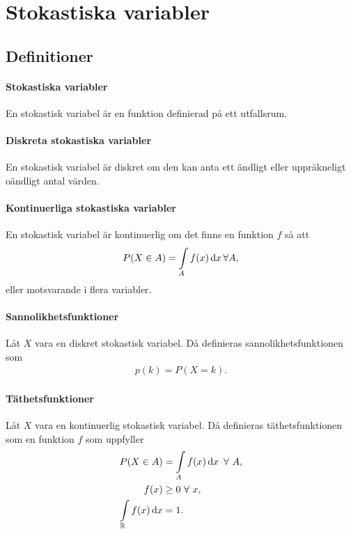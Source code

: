\section{Stokastiska variabler}

\subsection{Definitioner}

\paragraph{Stokastiska variabler}
En stokastisk variabel är en funktion definierad på ett utfallsrum.

\paragraph{Diskreta stokastiska variabler}
En stokastisk variabel är diskret om den kan anta ett ändligt eller uppräkneligt oändligt antal värden.

\paragraph{Kontinuerliga stokastiska variabler}
En stokastisk variabel är kontinuerlig om det finns en funktion $f$ så att
\begin{align*}
	P(X\in A) = \int\limits_{A}{}f(x)\dd{x}\forall A,
\end{align*}
eller motsvarande i flera variabler.

\paragraph{Sannolikhetsfunktioner}
Låt $X$ vara en diskret stokastisk variabel. Då definieras sannolikhetsfunktionen som
\begin{align*}
	p(k) = P(X = k).
\end{align*}

\paragraph{Täthetsfunktioner}
Låt $X$ vara en kontinuerlig stokastisk variabel. Då definieras täthetsfunktionen som en funktion $f$ som uppfyller
\begin{align*}
	P(X\in A)          &= \int\limits_{A}{}f(x)\dd{x}\ \forall\ A, \\
	f(x)               &\geq 0\ \forall\ x, \\
	\int\limits_{\mathbb{R}}{}f(x)\dd{x} &= 1.
\end{align*}

